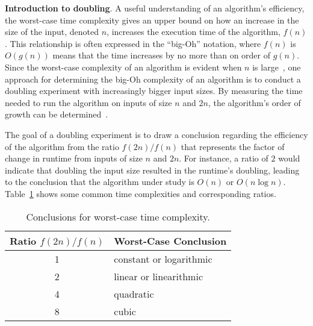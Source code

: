   {\bf Introduction to doubling}. A useful understanding of an algorithm's efficiency, the worst-case time complexity
gives an upper bound on how an increase in the size of the input, denoted $n$, increases the execution time of the
algorithm, $f(n)$.  This relationship is often expressed in the ``big-Oh'' notation, where $f(n)$ is $O(g(n))$ means
that the time increases by no more than on order of $g(n)$. Since the worst-case complexity of an algorithm is evident
when $n$ is large~\cite{mcgeoch2012}, one approach for determining the big-Oh complexity of an algorithm is to conduct
a doubling experiment with increasingly bigger input sizes. By measuring the time needed to run the algorithm on
inputs of size $n$ and $2n$, the algorithm's order of growth can be
determined~\cite{mcgeoch2012}.

The goal of a doubling experiment is to draw a conclusion regarding the efficiency of the algorithm from the ratio
$f(2n)/f(n)$ that represents the factor of change in runtime from inputs
of size $n$ and $2n$. For instance, a ratio of $2$
would indicate that doubling the input size resulted in the runtime's doubling, leading to the conclusion that the
algorithm under study is $O(n)$ or $O(n\log n)$.
Table~\ref{table:ratios} shows some common time complexities and
corresponding ratios.

\begin{table}[h!]
  \vspace*{-.05in}
  \begin{center}
    \begin{tabular}{c|l}
      Ratio $f(2n)/f(n)$ & Worst-Case Conclusion              \\ \hline
      1                  & constant or logarithmic \\
      2                  & linear or linearithmic  \\
      4                  & quadratic               \\
      8                  & cubic                   \\
    \end{tabular}
  \end{center}
  \vspace*{-.225in}

  \caption{Conclusions for worst-case time complexity.}~\label{table:ratios}
  \vspace*{-.225in}

\end{table}
